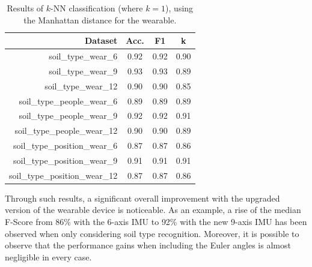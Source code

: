 \documentclass[10pt,conference]{IEEEtran}
\begin{document}
\begin{table}[!ht]
	\centering
	\caption{Results of $k$-NN classification (where $k=1$), using the Manhattan distance for the wearable.}
	\label{tab:wear_knn}
	\scalebox{0.75}
	{
		\begin{tabular}{rccc}
			\toprule
			    \textbf{Dataset}
			    & \textbf{Acc.}
			    & \textbf{F1}
			    & \textbf{k} \\
			\midrule
			soil\_type\_wear\_6            & 0.92 & 0.92 & 0.90 \\
			soil\_type\_wear\_9            & 0.93 & 0.93 & 0.89 \\
			soil\_type\_wear\_12           & 0.90 & 0.90 & 0.85 \\
			soil\_type\_people\_wear\_6    & 0.89 & 0.89 & 0.89 \\
			soil\_type\_people\_wear\_9    & 0.92 & 0.92 & 0.91 \\
			soil\_type\_people\_wear\_12   & 0.90 & 0.90 & 0.89 \\
			soil\_type\_position\_wear\_6  & 0.87 & 0.87 & 0.86 \\
			soil\_type\_position\_wear\_9  & 0.91 & 0.91 & 0.91 \\
			soil\_type\_position\_wear\_12 & 0.87 & 0.87 & 0.86 \\
			\bottomrule
		\end{tabular}
	}
\end{table}

Through such results, a significant overall improvement with the upgraded version of the wearable device is noticeable. As an example, a rise of the median F-Score from 86\% with the 6-axis IMU to 92\% with the new 9-axis IMU has been observed when only considering soil type recognition. Moreover, it is possible to observe that the performance gains when including the Euler angles is almost negligible in every case.

\end{document}
